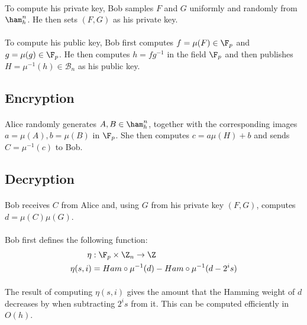 \paragraph{}
To compute his private key, Bob samples $F$ and $G$ uniformly and randomly from $\ham_h^n$. He then sets $(F, G)$ as his private key.

\paragraph{}
To compute his public key, Bob first computes $f = \mu(F) \in \F_p$ and $g = \mu(g) \in \F_p$. He then computes $h = f g^{-1}$ in the field $\F_p$ and then publishes $H = \mu^{-1}(h) \in \mathcal{B}_n$ as his public key.

\subsection{Encryption}
\paragraph{}
Alice randomly generates $A, B \in \ham_h^n$, together with the corresponding images $a = \mu(A), b = \mu(B)$ in $\F_p$. She then computes $c = a\mu(H) + b$ and sends $C = \mu^{-1}(c)$ to Bob.

\subsection{Decryption}
\paragraph{}
Bob receives $C$ from Alice and, using $G$ from his private key $(F, G)$, computes $d = \mu(C) \mu(G)$.

\paragraph{}
Bob first defines the following function:
\begin{align*}
\eta &: \F_p \times \Z_n \rightarrow \Z\\
\eta(s, i) &= Ham \circ \mu^{-1} (d) - Ham \circ \mu^{-1}(d - 2^i s)
\end{align*}

\paragraph{}
The result of computing $\eta(s, i)$ gives the amount that the Hamming weight of $d$ decreases by when subtracting $2^i s$ from it. This can be computed efficiently in $O(h)$.

